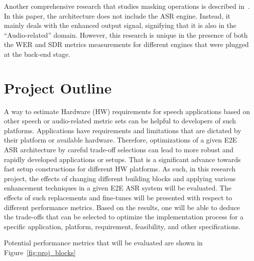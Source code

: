 Another comprehensive research 
that studies masking operations
is described in~\cite{8466865}.
In this paper, the architecture does not include
the ASR engine. 
Instead, it mainly deals with the enhanced output signal,
signifying that it is also in the ``Audio-related'' domain.
However, this research is unique in the presence of both the WER and SDR metrics measurements
for different engines that were plugged at the back-end stage.



\section{Project Outline}
A way to estimate Hardware (HW) requirements for speech
applications
based on other speech or audio-related metric sets
can be helpful to developers of such platforms.
Applications have requirements and limitations
that are dictated by their platform or available hardware.
Therefore, optimizations of a given E2E ASR architecture by careful
trade-off selections can lead to more robust and rapidly
developed applications or setups.
That is a significant advance towards fast setup constructions for different HW platforms.
As such, in this research project, the effects of changing different
building blocks and applying various enhancement techniques
in a given E2E ASR system will be evaluated.
The effects of such replacements and
fine-tunes will be presented with respect to different
performance metrics. Based on the results, one will be able to deduce the trade-offs
that can be selected to optimize the implementation process for a specific
application, platform, requirement, feasibility, and other specifications.

\bigskip

Potential performance metrics that will be evaluated
are shown in Figure~\ref{fig:proj_blocks}


